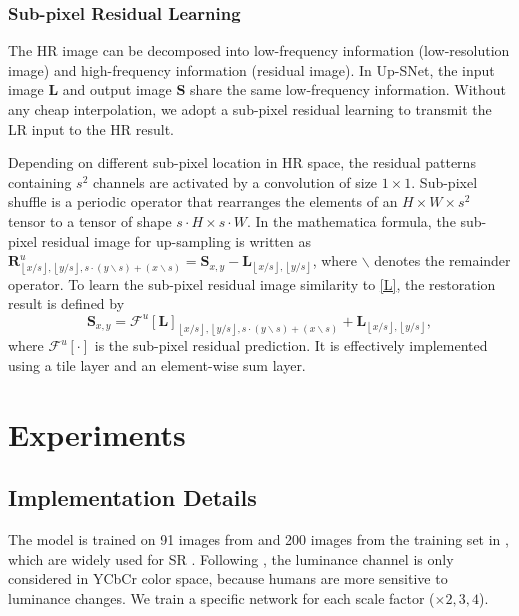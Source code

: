 \documentclass[runningheads]{llncs}
\begin{document}
\subsubsection{Sub-pixel Residual Learning}

The HR image can be decomposed into low-frequency information (low-resolution image) and high-frequency information (residual image). In Up-SNet, the input image $\textbf{L}$ and output image $\textbf{S}$ share the same low-frequency information. Without any cheap interpolation, we adopt a sub-pixel residual learning to transmit the LR input to the HR result.

Depending on different sub-pixel location in HR space, the residual patterns containing $s^2$ channels are activated by a convolution of size $1\times1$. Sub-pixel shuffle \cite{espcn} is a periodic operator that rearranges the elements of an $H \times W \times s^2$ tensor to a tensor of shape $s\cdot H \times s\cdot W$.
In the mathematica formula, the sub-pixel residual image for up-sampling is written as $\textbf{R}_{\left\lfloor {x/s} \right\rfloor ,\left\lfloor {y/s} \right\rfloor ,s \cdot \left( {y\backslash s} \right) + \left( {x\backslash s} \right)}^u = {\textbf{S}_{x,y}} - {\textbf{L}_{\left\lfloor {x/s} \right\rfloor ,\left\lfloor {y/s} \right\rfloor }}$, where $\backslash$ denotes the remainder operator. To learn the sub-pixel residual image similarity to \eqref{L}, the restoration result is defined by
 \begin{equation}\label{S}
 {\textbf{S}_{x,y}} = {\mathcal{F}^u}{\left[ \textbf{L} \right]_{\left\lfloor {x/s} \right\rfloor ,\left\lfloor {y/s} \right\rfloor ,s \cdot \left( {y\backslash s} \right) + \left( {x\backslash s} \right)}} + {\textbf{L}_{\left\lfloor {x/s} \right\rfloor ,\left\lfloor {y/s} \right\rfloor }},
 \end{equation}
where $\mathcal{F}^u{\left[ \cdot \right]}$ is the sub-pixel residual prediction. It is effectively implemented using a tile layer and an element-wise sum layer.

\section{Experiments}

\subsection{Implementation Details}
The model is trained on 91 images from \cite{sc} and 200 images from the training set in \cite{b100}, which are widely used for SR \cite{vdsr,drcn,drrn,memnet}. Following \cite{srcnn}, the luminance channel is only considered in YCbCr color space, because humans are more sensitive to luminance changes. We train a specific network for each scale factor ($\times 2, 3, 4$).
\end{document}
